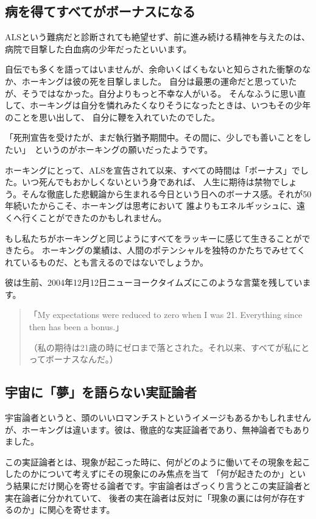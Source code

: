 \documentclass[10pt,b5paper,papersize,dvipdfmx]{jsbook}
\begin{document}
\subsection{病を得てすべてがボーナスになる}
ALSという難病だと診断されても絶望せず、前に進み続ける精神を与えたのは、病院で目撃した白血病の少年だったといいます。\par
自伝でも多くを語ってはいませんが、余命いくばくもないと知らされた衝撃のなか、ホーキングは彼の死を目撃しました。
自分は最悪の運命だと思っていたが、そうではなかった。自分よりもっと不幸な人がいる。
そんなふうに思い直して、ホーキングは自分を憐れみたくなりそうになったときは、いつもその少年のことを思い出して、
自分に鞭を入れていたのでした。\par
「死刑宣告を受けたが、まだ執行猶予期間中。その間に、少しでも善いことをしたい」\,
というのがホーキングの願いだったようです。\par
ホーキングにとって、ALSを宣告されて以来、すべての時間は「ボーナス」でした。いつ死んでもおかしくないという身であれば、
人生に期待は禁物でしょう。そんな徹底した悲観論から生まれる今日という日へのボーナス感。それが50年続いたからこそ、ホーキングは思考において
誰よりもエネルギッシュに、遠くへ行くことができたのかもしれません。\par
もし私たちがホーキングと同じようにすべてをラッキーに感じて生きることができたら。
ホーキングの業績は、人間のポテンシャルを独特のかたちでみせてくれているものだ、とも言えるのではないでしょうか。\par
彼は生前、2004年12月12日ニューヨークタイムズにこのような言葉を残しています。\par
\begin{quote}
「My expectations were reduced to zero when I was 21. Everything since then has been a bonus.」\par
（私の期待は21歳の時にゼロまで落とされた。それ以来、すべてが私にとってボーナスなんだ。）\par
\end{quote}

\subsection{宇宙に「夢」を語らない実証論者}
宇宙論者というと、頭のいいロマンチストというイメージもあるかもしれませんが、ホーキングは違います。彼は、徹底的な実証論者であり、無神論者でもありました。\par
この実証論者とは、現象が起こった時に、何がどのように働いてその現象を起こしたのかについて考えずにその現象にのみ焦点を当て
「何が起きたのか」という結果にだけ関心を寄せる論者です。宇宙論者はざっくり言うとこの実証論者と実在論者に分かれていて、
後者の実在論者は反対に「現象の裏には何が存在するのか」に関心を寄せます。\par
\end{document}
